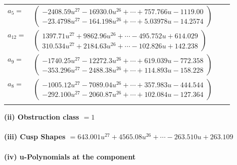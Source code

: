 \documentclass[1p]{elsarticle_modified}
\theoremstyle{definition}
\begin{document}
\begin{tabular}{m{7pt} m{180pt} m{7pt} m{180pt} }
\flushright $a_{5}=$&$\begin{pmatrix}-2408.59 u^{27}-16930.0 u^{26}+\cdots+757.766 u-1119.00\\-23.4798 u^{27}-164.198 u^{26}+\cdots+5.03978 u-14.2574\end{pmatrix}$ \\
\flushright $a_{12}=$&$\begin{pmatrix}1397.71 u^{27}+9862.96 u^{26}+\cdots-495.752 u+614.029\\310.534 u^{27}+2184.63 u^{26}+\cdots-102.826 u+142.238\end{pmatrix}$ \\
\flushright $a_{9}=$&$\begin{pmatrix}-1740.25 u^{27}-12272.3 u^{26}+\cdots+619.039 u-772.358\\-353.296 u^{27}-2488.38 u^{26}+\cdots+114.893 u-158.228\end{pmatrix}$ \\
\flushright $a_{8}=$&$\begin{pmatrix}-1005.12 u^{27}-7089.04 u^{26}+\cdots+357.983 u-444.544\\-292.100 u^{27}-2060.87 u^{26}+\cdots+102.084 u-127.364\end{pmatrix}$\\&\end{tabular}
\flushleft \textbf{(ii) Obstruction class $= 1$}\\~\\
\flushleft \textbf{(iii) Cusp Shapes $= 643.001 u^{27}+4565.08 u^{26}+\cdots-263.510 u+263.109$}\\~\\
\newpage\renewcommand{\arraystretch}{1}
\flushleft \textbf{(iv) u-Polynomials at the component}\newline \\
\end{document}
